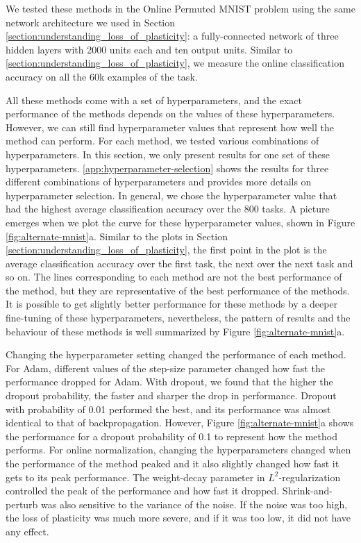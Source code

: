 \documentclass[review, number,3p]{elsarticle}
\begin{document}
We tested these methods in the Online Permuted MNIST problem using the same network architecture we used in Section \ref{section:understanding_loss_of_plasticity}: a fully-connected network of three hidden layers with 2000 units each and ten output units.
Similar to \ref{section:understanding_loss_of_plasticity}, we measure the online classification accuracy on all the 60k examples of the task.

All these methods come with a set of hyperparameters, and the exact performance of the methods depends on the values of these hyperparameters.
However, we can still find hyperparameter values that represent how well the method can perform.
For each method, we tested various combinations of hyperparameters. 
In this section, we only present results for one set of these hyperparameters. 
\ref{app:hyperparameter-selection} shows the results for three different combinations of hyperparameters and provides more details on hyperparameter selection.
In general, we chose the hyperparameter value that had the highest average classification accuracy over the 800 tasks.
A picture emerges when we plot the curve for these hyperparameter values, shown in Figure \ref{fig:alternate-mnist}a.
Similar to the plots in Section \ref{section:understanding_loss_of_plasticity}, the first point in the plot is the average classification accuracy over the first task, the next over the next task and so on.
The lines corresponding to each method are not the best performance of the method, but they are representative of the best performance of the methods.
It is possible to get slightly better performance for these methods by a deeper fine-tuning of these hyperparameters, nevertheless, the pattern of results and the behaviour of these methods is well summarized by Figure \ref{fig:alternate-mnist}a. 

Changing the hyperparameter setting changed the performance of each method.
For Adam, different values of the step-size parameter changed how fast the performance dropped for Adam.
With dropout, we found that the higher the dropout probability, the faster and sharper the drop in performance.
Dropout with probability of 0.01 performed the best, and its performance was almost identical to that of backpropagation.
However, Figure \ref{fig:alternate-mnist}a shows the performance for a dropout probability of 0.1 to represent how the method performs.
For online normalization, changing the hyperparameters changed when the performance of the method peaked and it also slightly changed how fast it gets to its peak performance.
The weight-decay parameter in $L^2$-regularization controlled the peak of the performance and how fast it dropped.
Shrink-and-perturb was also sensitive to the variance of the noise. 
If the noise was too high, the loss of plasticity was much more severe, and if it was too low, it did not have any effect.
\end{document}
